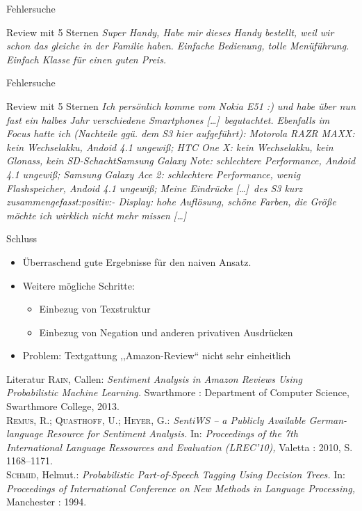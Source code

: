 \documentclass[note=hide]{beamer} %
\newcommand{\ellipse}{[\ldots]}
\begin{document}
\begin{frame}{Fehlersuche}
	\begin{block}{Review mit 5 Sternen}
		\it
		Super Handy, Habe mir dieses Handy bestellt, weil wir schon das gleiche in der Familie haben. Einfache Bedienung, tolle Menüführung. Einfach Klasse für einen guten Preis.
	\end{block}
\end{frame}

\begin{frame}{Fehlersuche}
	\begin{block}{Review mit 5 Sternen}
		\it
	Ich persönlich komme vom Nokia E51 :) und habe über nun fast ein halbes Jahr verschiedene Smartphones \ellipse\ begutachtet. Ebenfalls im Focus hatte ich (Nachteile ggü. dem S3 hier aufgeführt): Motorola RAZR MAXX: kein Wechselakku, Andoid 4.1 ungewiß; HTC One X: kein Wechselakku, kein Glonass, kein SD-SchachtSamsung Galaxy Note: schlechtere Performance, Andoid 4.1 ungewiß; Samsung Galaxy Ace 2: schlechtere Performance, wenig Flashspeicher, Andoid 4.1 ungewiß; Meine Eindrücke \ellipse\ des S3 kurz zusammengefasst:positiv:- Display: hohe Auflösung, schöne Farben, die Größe möchte ich wirklich nicht mehr missen \ellipse
	\end{block}
\end{frame}

\begin{frame}{Schluss}

	\begin{itemize}
		\item Überraschend gute Ergebnisse für den naiven Ansatz.
		\item Weitere mögliche Schritte:
			\begin{itemize}
				\item Einbezug von Texstruktur
				\item Einbezug von Negation und anderen privativen Ausdrücken
			\end{itemize}
		\item Problem: Textgattung ,,Amazon-Review`` nicht sehr einheitlich
	\end{itemize}
\end{frame}

\begin{frame}{Literatur}
	\small
	\textsc{Rain,} Callen: \textit{Sentiment Analysis in Amazon Reviews Using Probabilistic Machine Learning.} Swarthmore : Department of Computer Science, Swarthmore College, 2013.\\[0.3cm]

	\textsc{Remus,} R.; \textsc{Quasthoff,} U.; \textsc{Heyer,} G.: \textit{SentiWS -- a Publicly Available German-language Resource for Sentiment Analysis.} In: \textit{Proceedings of the 7th International Language Ressources and Evaluation (LREC'10),} Valetta : 2010, S. 1168--1171.\\[0.3cm]

	\textsc{Schmid,} Helmut.: \textit{Probabilistic Part-of-Speech Tagging Using Decision Trees.} In: \textit{Proceedings of International Conference on New Methods in Language Processing,} Manchester : 1994.
\end{frame}
\end{document}
